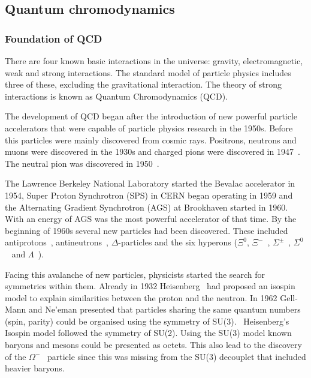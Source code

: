 \pagebreak
\subsection{Quantum chromodynamics}
\subsubsection{Foundation of QCD}
There are four known basic interactions in the universe: gravity, electromagnetic, weak and strong interactions. The standard model of particle physics includes three of these, excluding the gravitational interaction. The theory of strong interactions is known as Quantum Chromodynamics (QCD).

The development of QCD began after the introduction of new powerful particle accelerators that were capable of particle physics research in the 1950s. Before this particles were mainly discovered from cosmic rays. Positrons, neutrons and muons were discovered in the 1930s and charged pions were discovered in 1947~\cite{Occhialini:1987nr,Lattes:1947mx}. The neutral pion was discovered in 1950~\cite{Bjorklund:1950}.

The Lawrence Berkeley National Laboratory started the Bevalac accelerator in 1954, Super Proton Synchrotron (SPS) in CERN began operating in 1959 and the Alternating Gradient Synchrotron (AGS) at Brookhaven started in 1960. With an energy of \unit[33]{\gev} AGS was the most powerful accelerator of that time. By the beginning of 1960s several new particles had been discovered. These included antiprotons~\cite{Chamberlain:1955ns}, antineutrons~\cite{Cork:1957nu}, $\Delta$-particles and the six hyperons ($\Xi^0$\cite{Alvarez:1959zz}, $\Xi^-$~\cite{Armenteros:1952nt}, $\Sigma^{\pm}$~\cite{Bonetti1953}, $\Sigma^0$~\cite{Plano1957} and $\Lambda$~\cite{Fowler:1953qpk}).

Facing this avalanche of new particles, physicists started the search for symmetries within them. Already in 1932 Heisenberg~\cite{Heisenberg:1932} 
had proposed an isospin model to explain similarities between the proton and the neutron. In 1962 Gell-Mann and Ne'eman presented that particles sharing the same quantum numbers (spin, parity) could be organised using the symmetry of SU(3).~\cite{Gell-Mann:1962} Heisenberg's Isospin model followed the symmetry of SU(2). Using the SU(3) model known baryons and mesons could be presented as octets. This also lead to the discovery of the $\Omega^{-}$~\cite{Barnes:1964ga} particle since this was missing from the SU(3) decouplet that included heavier baryons. 

